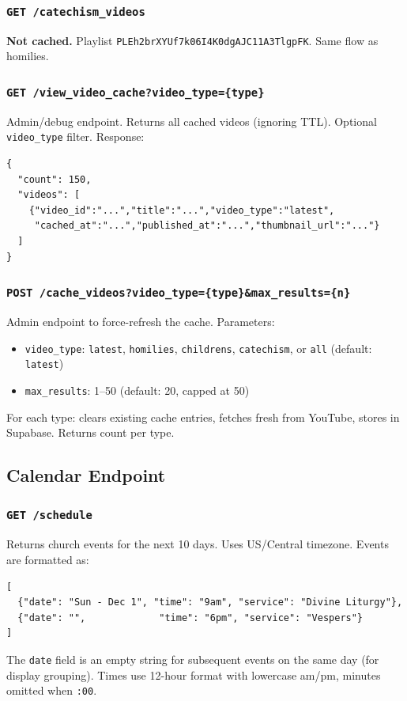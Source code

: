 \documentclass[12pt]{article}
\begin{document}
\subsubsection{\texttt{GET /catechism\_videos}}
\textbf{Not cached.} Playlist \texttt{PLEh2brXYUf7k06I4K0dgAJC11A3TlgpFK}. Same flow as homilies.

\subsubsection{\texttt{GET /view\_video\_cache?video\_type=\{type\}}}
Admin/debug endpoint. Returns all cached videos (ignoring TTL). Optional \texttt{video\_type} filter. Response:
\begin{lstlisting}[language={}, basicstyle=\ttfamily\footnotesize, frame=none, numbers=none]
{
  "count": 150,
  "videos": [
    {"video_id":"...","title":"...","video_type":"latest",
     "cached_at":"...","published_at":"...","thumbnail_url":"..."}
  ]
}
\end{lstlisting}

\subsubsection{\texttt{POST /cache\_videos?video\_type=\{type\}\&max\_results=\{n\}}}
Admin endpoint to force-refresh the cache. Parameters:
\begin{itemize}
    \item \texttt{video\_type}: \texttt{latest}, \texttt{homilies}, \texttt{childrens}, \texttt{catechism}, or \texttt{all} (default: \texttt{latest})
    \item \texttt{max\_results}: 1--50 (default: 20, capped at 50)
\end{itemize}
For each type: clears existing cache entries, fetches fresh from YouTube, stores in Supabase. Returns count per type.

\subsection{Calendar Endpoint}

\subsubsection{\texttt{GET /schedule}}
Returns church events for the next 10 days. Uses US/Central timezone. Events are formatted as:
\begin{lstlisting}[language={}, basicstyle=\ttfamily\footnotesize, frame=none, numbers=none]
[
  {"date": "Sun - Dec 1", "time": "9am", "service": "Divine Liturgy"},
  {"date": "",             "time": "6pm", "service": "Vespers"}
]
\end{lstlisting}
The \texttt{date} field is an empty string for subsequent events on the same day (for display grouping). Times use 12-hour format with lowercase am/pm, minutes omitted when \texttt{:00}.
\end{document}
